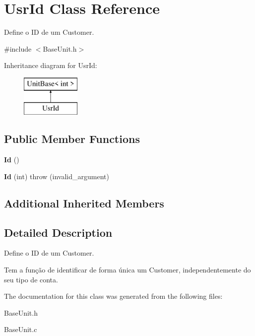 \hypertarget{classUsrId}{\section{Usr\-Id Class Reference}
\label{classUsrId}
}


Define o I\-D de um Customer.  




{\ttfamily \#include $<$Base\-Unit.\-h$>$}

Inheritance diagram for Usr\-Id\-:\begin{figure}[H]
\begin{center}
\leavevmode
\includegraphics[height=2.000000cm]{classUsrId}
\end{center}
\end{figure}
\subsection*{Public Member Functions}
\begin{DoxyCompactItemize}
\item 
\hypertarget{classUsrId_a90f49e923fb187c5330f71a75cd643a2}{{\bfseries Id} ()}\label{classUsrId_a90f49e923fb187c5330f71a75cd643a2}

\item 
\hypertarget{classUsrId_a492418ee700c6a34d1dda28054b369b0}{{\bfseries Id} (int)  throw (invalid\-\_\-argument)}\label{classUsrId_a492418ee700c6a34d1dda28054b369b0}

\end{DoxyCompactItemize}
\subsection*{Additional Inherited Members}


\subsection{Detailed Description}
Define o I\-D de um Customer. 

Tem a função de identificar de forma única um Customer, independentemente do seu tipo de conta. 

The documentation for this class was generated from the following files\-:\begin{DoxyCompactItemize}
\item 
Base\-Unit.\-h\item 
Base\-Unit.\-c\end{DoxyCompactItemize}
